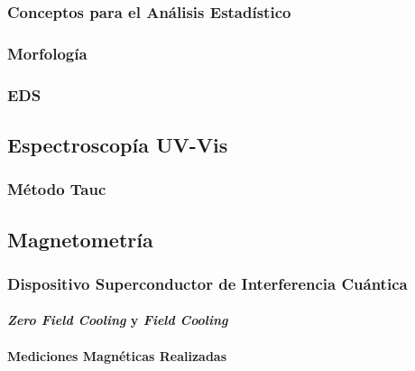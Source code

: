 \documentclass[../main.tex]{subfiles}
\begin{document}
\subsubsection{Conceptos para el Análisis Estadístico}

\subsubsection{Morfología}

\subsubsection{EDS}

\subsection{Espectroscopía UV-Vis}

\subsubsection{Método Tauc}

\subsection{Magnetometría}

\subsubsection{Dispositivo Superconductor de Interferencia Cuántica}

\paragraph{\textit{Zero Field Cooling} y \textit{Field Cooling}}

\paragraph{Mediciones Magnéticas Realizadas}
\end{document}
